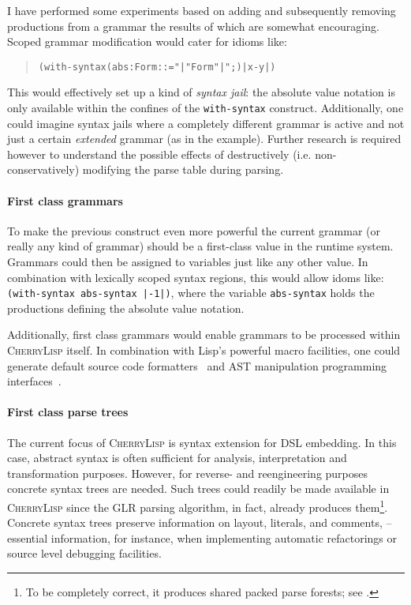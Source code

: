 \documentclass[a4paper]{llncs}
\def\cherrylisp{\textsc{CherryLisp}\xspace}
\begin{document}
I have performed some experiments based on adding and subsequently
removing productions from a grammar the results of which are somewhat
encouraging. Scoped grammar modification would cater for idioms like:
\begin{quote}
\begin{alltt}
(with-syntax (abs:Form ::= "|" Form "|";) |x - y|)
\end{alltt}
\end{quote}
This would effectively set up a kind of \textit{syntax jail}: the
absolute value notation is only available within the confines of the
\texttt{with-syntax} construct. Additionally, one could imagine syntax
jails where a completely different grammar is active and not just a
certain \textit{extended} grammar (as in the example). Further
research is required however to understand the possible effects of
destructively (i.e. non-conservatively) modifying the parse table
during parsing.

\paragraph{First class grammars} To make the previous construct even
more powerful the current grammar (or really any kind of grammar)
should be a first-class value in the runtime system. Grammars could
then be assigned to variables just like any other value. In
combination with lexically scoped syntax regions, this would allow
idoms like: \texttt{(with-syntax abs-syntax |-1|)}, where the
variable \texttt{abs-syntax} holds the productions defining the
absolute value notation.

Additionally, first class grammars would enable grammars to be
processed within \cherrylisp itself. In combination with Lisp's
powerful macro facilities, one could generate default source code
formatters~\cite{PrettyPrintingSoftwareReengineering} and AST
manipulation programming interfaces~\cite{APIGen}.

\paragraph{First class parse trees} The current focus of \cherrylisp
is syntax extension for DSL embedding. In this case, abstract syntax
is often sufficient for analysis, interpretation and transformation
purposes. However, for reverse- and reengineering purposes concrete
syntax trees are needed. Such trees could readily be made available in
\cherrylisp since the GLR parsing algorithm, in fact, already produces
them\footnote{To be completely correct, it produces shared packed
  parse forests; see \cite{RekersThesis}.}. Concrete syntax trees
preserve information on layout, literals, and comments, -- essential
information, for instance, when implementing automatic refactorings or
source level debugging facilities.
\end{document}
